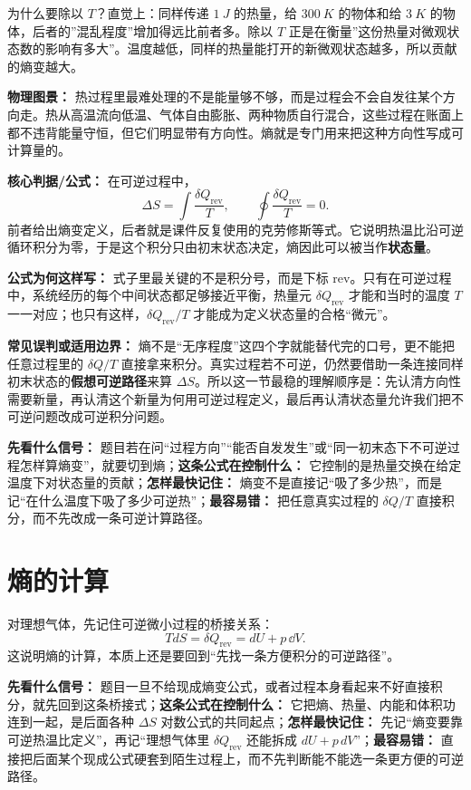 \documentclass[lang=cn,11pt]{elegantbook}
\newcommand{\bridge}[1]{\begin{note}#1\end{note}}
\begin{document}
\bridge{为什么要除以 \(T\)？直觉上：同样传递 \(\SI{1}{J}\) 的热量，给 \(\SI{300}{K}\) 的物体和给 \(\SI{3}{K}\) 的物体，后者的”混乱程度”增加得远比前者多。除以 \(T\) 正是在衡量”这份热量对微观状态数的影响有多大”。温度越低，同样的热量能打开的新微观状态越多，所以贡献的熵变越大。}

\textbf{物理图景：} 热过程里最难处理的不是能量够不够，而是过程会不会自发往某个方向走。热从高温流向低温、气体自由膨胀、两种物质自行混合，这些过程在账面上都不违背能量守恒，但它们明显带有方向性。熵就是专门用来把这种方向性写成可计算量的。

\textbf{核心判据/公式：} 在可逆过程中，
\[
\Delta S=\int \frac{\delta Q_{\mathrm{rev}}}{T},\qquad
\oint \frac{\delta Q_{\mathrm{rev}}}{T}=0.
\]
前者给出熵变定义，后者就是课件反复使用的克劳修斯等式。它说明热温比沿可逆循环积分为零，于是这个积分只由初末状态决定，熵因此可以被当作\textbf{状态量}。

\textbf{公式为何这样写：} 式子里最关键的不是积分号，而是下标 \(\mathrm{rev}\)。只有在可逆过程中，系统经历的每个中间状态都足够接近平衡，热量元 \(\delta Q_{\mathrm{rev}}\) 才能和当时的温度 \(T\) 一一对应；也只有这样，\(\delta Q_{\mathrm{rev}}/T\) 才能成为定义状态量的合格“微元”。

\textbf{常见误判或适用边界：} 熵不是“无序程度”这四个字就能替代完的口号，更不能把任意过程里的 \(\delta Q/T\) 直接拿来积分。真实过程若不可逆，仍然要借助一条连接同样初末状态的\textbf{假想可逆路径}来算 \(\Delta S\)。所以这一节最稳的理解顺序是：先认清方向性需要新量，再认清这个新量为何用可逆过程定义，最后再认清状态量允许我们把不可逆问题改成可逆积分问题。

\begin{note}
\textbf{先看什么信号：} 题目若在问“过程方向”“能否自发发生”或“同一初末态下不可逆过程怎样算熵变”，就要切到熵；\textbf{这条公式在控制什么：} 它控制的是热量交换在给定温度下对状态量的贡献；\textbf{怎样最快记住：} 熵变不是直接记“吸了多少热”，而是记“在什么温度下吸了多少可逆热”；\textbf{最容易错：} 把任意真实过程的 \(\delta Q/T\) 直接积分，而不先改成一条可逆计算路径。
\end{note}

\section{熵的计算}

对理想气体，先记住可逆微小过程的桥接关系：
\[
TdS=\delta Q_{\mathrm{rev}}=dU+p\,\dd V.
\]
这说明熵的计算，本质上还是要回到“先找一条方便积分的可逆路径”。

\begin{note}
\textbf{先看什么信号：} 题目一旦不给现成熵变公式，或者过程本身看起来不好直接积分，就先回到这条桥接式；\textbf{这条公式在控制什么：} 它把熵、热量、内能和体积功连到一起，是后面各种 \(\Delta S\) 对数公式的共同起点；\textbf{怎样最快记住：} 先记“熵变要靠可逆热温比定义”，再记“理想气体里 \(\delta Q_{\mathrm{rev}}\) 还能拆成 \(dU+p\,dV\)”；\textbf{最容易错：} 直接把后面某个现成公式硬套到陌生过程上，而不先判断能不能选一条更方便的可逆路径。
\end{note}
\end{document}
